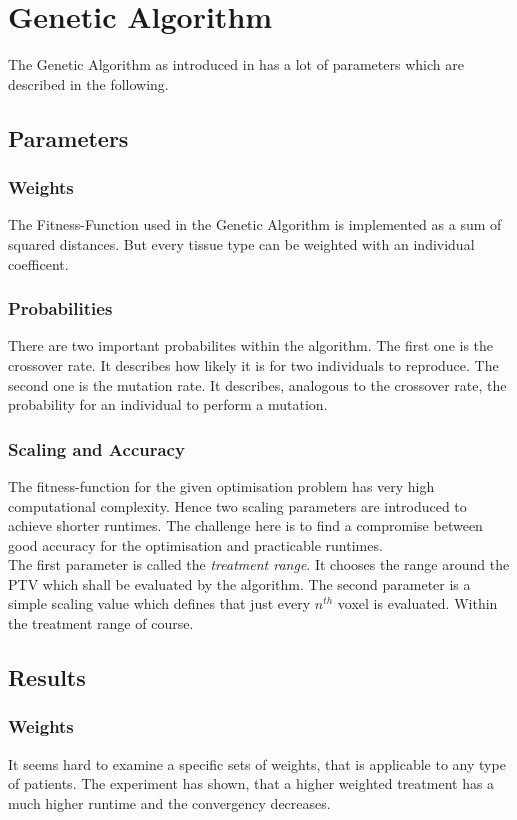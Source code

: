 \documentclass[USenglish,twocolumn]{article}
\begin{document}
\section{Genetic Algorithm}
The Genetic Algorithm as introduced in \citep{1} has a lot of parameters which are described in the following. 

\subsection{Parameters}

\subsubsection{Weights}
The Fitness-Function used in the Genetic Algorithm is implemented as a sum of squared distances. But every tissue type can be weighted with an individual coefficent. 

\subsubsection{Probabilities} 
There are two important probabilites within the algorithm. The first one is the crossover rate. It describes how likely it is for two individuals to reproduce. The second one is the mutation rate. It describes, analogous to the crossover rate, the probability for an individual to perform a mutation. 

\subsubsection{Scaling and Accuracy}
The fitness-function for the given optimisation problem has very high computational complexity. Hence two scaling parameters are introduced to achieve shorter runtimes. The challenge here is to find a compromise between good accuracy for the optimisation and practicable runtimes.\\ The first parameter is called the \textit{treatment range}. It chooses the range around the PTV which shall be evaluated by the algorithm. The second parameter is a simple scaling value which defines that just every  $n^{th}$ voxel is evaluated. Within the treatment range of course.


\subsection{Results}


\subsubsection{Weights}
It seems hard to examine a specific sets of weights, that is applicable to any type of patients. The experiment has shown, that a higher weighted treatment has a much higher runtime and the convergency decreases.  
\end{document}
